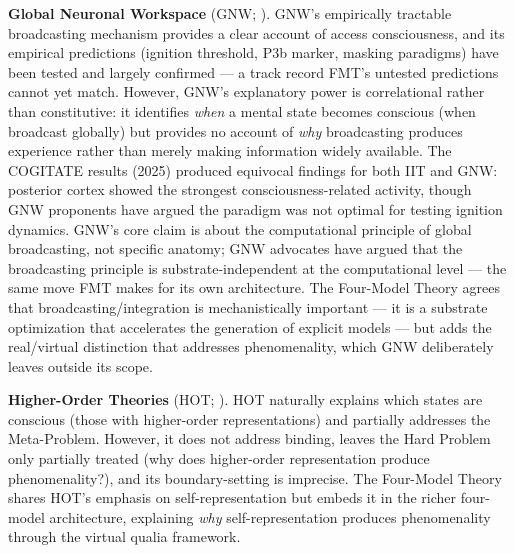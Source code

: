 \documentclass[12pt]{article}
\newcommand{\revstart}{}
\newcommand{\revend}{}
\begin{document}
{\revstart\textbf{Global Neuronal Workspace} (GNW; \citealp{Baars1988,Dehaene2011,Dehaene2021}). GNW's empirically tractable broadcasting mechanism provides a clear account of access consciousness, and its empirical predictions (ignition threshold, P3b marker, masking paradigms) have been tested and largely confirmed --- a track record FMT's untested predictions cannot yet match. However, GNW's explanatory power is correlational rather than constitutive: it identifies \emph{when} a mental state becomes conscious (when broadcast globally) but provides no account of \emph{why} broadcasting produces experience rather than merely making information widely available. The COGITATE results (2025) produced equivocal findings for both IIT and GNW: posterior cortex showed the strongest consciousness-related activity, though GNW proponents have argued the paradigm was not optimal for testing ignition dynamics. GNW's core claim is about the computational principle of global broadcasting, not specific anatomy; GNW advocates have argued \citep{Dehaene2021} that the broadcasting principle is substrate-independent at the computational level --- the same move FMT makes for its own architecture. The Four-Model Theory agrees that broadcasting/integration is mechanistically important --- it is a substrate optimization that accelerates the generation of explicit models --- but adds the real/virtual distinction that addresses phenomenality, which GNW deliberately leaves outside its scope.\revend}

\textbf{Higher-Order Theories} (HOT; \citealp{Rosenthal2005,Lau2011}). HOT naturally explains which states are conscious (those with higher-order representations) and partially addresses the Meta-Problem. However, it does not address binding, leaves the Hard Problem only partially treated (why does higher-order representation produce phenomenality?), and its boundary-setting is imprecise. The Four-Model Theory shares HOT's emphasis on self-representation but embeds it in the richer four-model architecture, explaining \emph{why} self-representation produces phenomenality through the virtual qualia framework.
\end{document}
